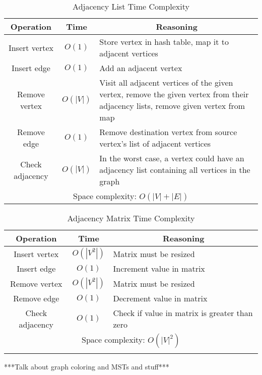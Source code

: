 \begin{table}[H]
	\caption{Adjacency List Time Complexity}
	\label{tab:adjlist}
	\begin{tabularx}{\textwidth}{|c|c|X|}
		\vtabularspace{3}
		\hline
		Operation & Time & \multicolumn{1}{c|}{Reasoning} \\
		\hline
		Insert vertex & $O(1)$ & Store vertex in hash table, map it to adjacent vertices \\
		Insert edge & $O(1)$ & Add an adjacent vertex \\
		Remove vertex & $O(|V|)$ & Visit all adjacent vertices of the given vertex, remove the given vertex from their adjacency lists, remove given vertex from map \\
		Remove edge & $O(1)$ & Remove destination vertex from source vertex's list of adjacent vertices \\
		Check adjacency & $O(|V|)$ & In the worst case, a vertex could have an adjacency list containing all vertices in the graph \\
		\hline
		\hline
		\multicolumn{3}{c}{Space complexity: $O(|V|+|E|)$} \\
		\hline
		\hline
	\end{tabularx}
\end{table}

\begin{table}[H]
	\caption{Adjacency Matrix Time Complexity}
	\label{tab:adjmatrix}
	\begin{tabularx}{\textwidth}{|c|c|X|}
		\vtabularspace{3}
		\hline
		Operation & Time & \multicolumn{1}{c|}{Reasoning} \\
		\hline
		Insert vertex & $O(|V^2|)$ & Matrix must be resized \\
		Insert edge & $O(1)$ & Increment value in matrix \\
		Remove vertex & $O(|V^2|)$ & Matrix must be resized \\
		Remove edge & $O(1)$ & Decrement value in matrix \\
		Check adjacency & $O(1)$ & Check if value in matrix is greater than zero \\
		\hline
		\hline
		\multicolumn{3}{c}{Space complexity: $O(|V|^2)$} \\
		\hline
		\hline
		\vtabularspace{3}
	\end{tabularx}
\end{table}

***Talk about graph coloring and MSTs and stuff*** \\

